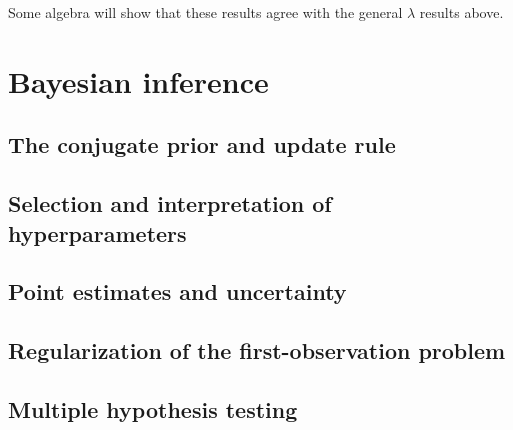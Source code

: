 \documentclass[12pt, letterpaper]{article}
\begin{document}
Some algebra will show that these results agree with the general $\lambda$ results above.

\section{Bayesian inference}

\subsection{The conjugate prior and update rule}

\subsection{Selection and interpretation of hyperparameters}

\subsection{Point estimates and uncertainty}

\subsection{Regularization of the first-observation problem}

\subsection{Multiple hypothesis testing}
\end{document}
